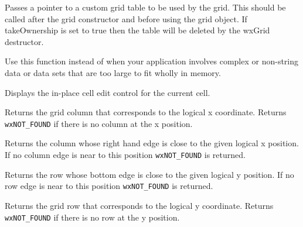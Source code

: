 





\label{wxgridsettable}


Passes a pointer to a custom grid table to be used by the grid. This should be called
after the grid constructor and before using the grid object. If takeOwnership is set to
true then the table will be deleted by the wxGrid destructor.

Use this function instead of  when your
application involves complex or non-string data or data sets that are too large to fit
wholly in memory.



\label{wxgridshowcelleditcontrol}


Displays the in-place cell edit control for the current cell.



\label{wxgridxtocol}


Returns the grid column that corresponds to the logical x coordinate. Returns 
{\tt wxNOT\_FOUND} if there is no column at the x position.



\label{wxgridxtoedgeofcol}


Returns the column whose right hand edge is close to the given logical x position.
If no column edge is near to this position {\tt wxNOT\_FOUND} is returned.



\label{wxgridytoedgeofrow}


Returns the row whose bottom edge is close to the given logical y position.
If no row edge is near to this position {\tt wxNOT\_FOUND} is returned.



\label{wxgridytorow}


Returns the grid row that corresponds to the logical y coordinate. Returns 
{\tt wxNOT\_FOUND} if there is no row at the y position.

